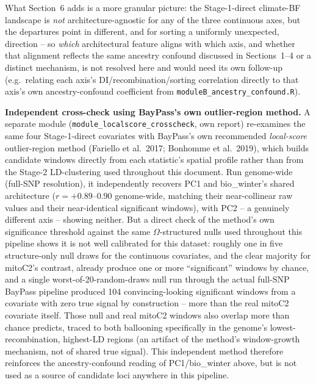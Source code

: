 \documentclass[11pt]{article}
\begin{document}
What Section~6 adds is a more granular picture: the Stage-1-direct climate-BF
landscape is \emph{not} architecture-agnostic for any of the three continuous axes, but the
departures point in different, and for sorting a uniformly unexpected, direction -- so
\emph{which} architectural feature aligns with which axis, and whether that alignment
reflects the same ancestry confound discussed in Sections~1--4 or a distinct mechanism, is
not resolved here and would need its own follow-up (e.g.\ relating each axis's
DI/recombination/sorting correlation directly to that axis's own ancestry-confound
coefficient from \texttt{moduleB\_ancestry\_confound.R}).

\textbf{Independent cross-check using BayPass's own outlier-region method.} A separate module
(\texttt{module\_localscore\_crosscheck}, own report) re-examines the same four Stage-1-direct
covariates with BayPass's own recommended \emph{local-score} outlier-region method (Fariello
et al.\ 2017; Bonhomme et al.\ 2019), which builds candidate windows directly from each
statistic's spatial profile rather than from the Stage-2 LD-clustering used throughout this
document. Run genome-wide (full-SNP resolution), it independently recovers PC1 and
bio\_winter's shared architecture ($r=+0.89$--$0.90$ genome-wide, matching their near-collinear
raw values and their near-identical significant windows), with PC2 -- a genuinely different
axis -- showing neither. But a direct check of the method's own significance threshold against
the same $\Omega$-structured nulls used throughout this pipeline shows it is not well
calibrated for this dataset: roughly one in five structure-only null draws for the continuous
covariates, and the clear majority for mitoC2's contrast, already produce one or more
``significant'' windows by chance, and a single worst-of-20-random-draws null run through the
actual full-SNP BayPass pipeline produced 104 convincing-looking significant windows from a
covariate with zero true signal by construction -- more than the real mitoC2 covariate itself.
Those null and real mitoC2 windows also overlap more than chance predicts, traced to both
ballooning specifically in the genome's lowest-recombination, highest-LD regions (an artifact
of the method's window-growth mechanism, not of shared true signal). This independent method
therefore reinforces the ancestry-confound reading of PC1/bio\_winter above, but is not used
as a source of candidate loci anywhere in this pipeline.

\clearpage
\end{document}
